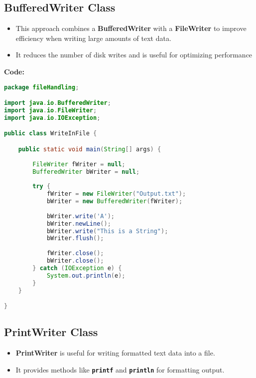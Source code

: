 \subsection{BufferedWriter Class}
\begin{itemize}
	\item This approach combines a \textbf{BufferedWriter} with a \textbf{FileWriter} to improve efficiency when writing large amounts of text data.
	\item It reduces the number of disk writes and is useful for optimizing performance
\end{itemize}
\textbf{Code:}
\begin{lstlisting}[language=java]
package fileHandling;

import java.io.BufferedWriter;
import java.io.FileWriter;
import java.io.IOException;

public class WriteInFile {

	public static void main(String[] args) {
		
		FileWriter fWriter = null;
		BufferedWriter bWriter = null;
		
		try {
			fWriter = new FileWriter("Output.txt");
			bWriter = new BufferedWriter(fWriter);
			
			bWriter.write('A');
			bWriter.newLine();
			bWriter.write("This is a String");
			bWriter.flush();
			
			fWriter.close();
			bWriter.close();
		} catch (IOException e) {
			System.out.println(e);
		}
	}

}

\end{lstlisting}


\newpage
\subsection{PrintWriter Class}
\begin{itemize}
	\item \textbf{PrintWriter} is useful for writing formatted text data into a file.
	\item It provides methods like \textbf{\texttt{printf}} and \textbf{\texttt{println}} for formatting output.
\end{itemize}

